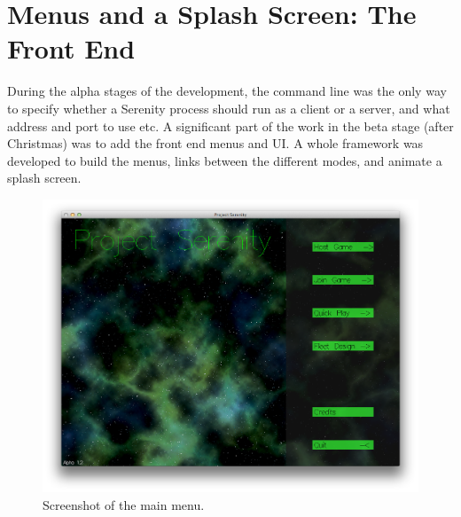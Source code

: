 \section{Menus and a Splash Screen: The Front End}


During the alpha stages of the development, the command line was the only way to specify whether a Serenity process should run as a client or a server, and what address and port to use etc. A significant part of the work in the beta stage (after Christmas) was to add the front end menus and UI. A whole framework was developed to build the menus, links between the different modes, and animate a splash screen. 

\begin{figure}
	\hspace{-2.5em}\includegraphics[width=17cm]{res/serenityscreens/01-mainmenu}
	\caption[Screenshot of the main menu]{Screenshot of the main menu.}
	\label{fig:mainmenu}
\end{figure}

